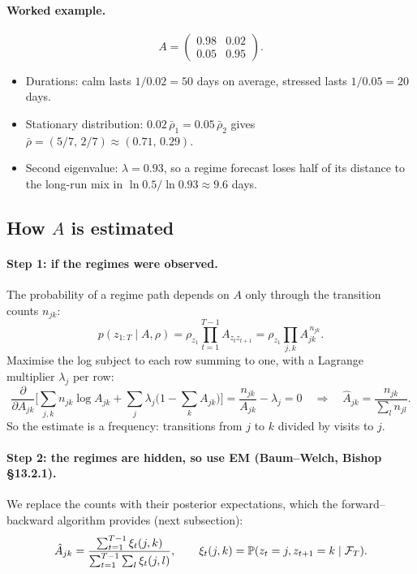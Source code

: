 \paragraph{Worked example.}
\begin{equation}
A=\begin{pmatrix}0.98&0.02\\0.05&0.95\end{pmatrix}.
\end{equation}
\begin{itemize}
  \item Durations: calm lasts $1/0.02=50$ days on average, stressed lasts $1/0.05=20$ days.
  \item Stationary distribution: $0.02\,\bar\rho_1=0.05\,\bar\rho_2$ gives $\bar\rho=(5/7,\,2/7)\approx(0.71,\,0.29)$.
  \item Second eigenvalue: $\lambda=0.93$, so a regime forecast loses half of its distance to the long-run mix in $\ln0.5/\ln0.93\approx9.6$ days.
\end{itemize}

\subsection{How $A$ is estimated}

\paragraph{Step 1: if the regimes were observed.} The probability of a regime path depends on $A$ only through the transition counts $n_{jk}$:
\begin{equation}
p(z_{1:T}\mid A,\rho)=\rho_{z_1}\prod_{t=1}^{T-1}A_{z_tz_{t+1}}=\rho_{z_1}\prod_{j,k}A_{jk}^{\,n_{jk}}.
\end{equation}
Maximise the log subject to each row summing to one, with a Lagrange multiplier $\lambda_j$ per row:
\begin{equation}
\frac{\partial}{\partial A_{jk}}\Big[\sum_{j,k}n_{jk}\log A_{jk}+\sum_j\lambda_j\Big(1-\sum_kA_{jk}\Big)\Big]=\frac{n_{jk}}{A_{jk}}-\lambda_j=0\quad\Rightarrow\quad\hat A_{jk}=\frac{n_{jk}}{\sum_ln_{jl}}.
\end{equation}
So the estimate is a frequency: transitions from $j$ to $k$ divided by visits to $j$.

\paragraph{Step 2: the regimes are hidden, so use EM (Baum--Welch, Bishop \S13.2.1).} We replace the counts with their posterior expectations, which the forward--backward algorithm provides (next subsection):
\begin{equation}
\hat A_{jk}=\frac{\sum_{t=1}^{T-1}\xi_t(j,k)}{\sum_{t=1}^{T-1}\sum_l\xi_t(j,l)},\qquad\xi_t(j,k)=\mathbb P(z_t=j,z_{t+1}=k\mid\mathcal{F}_T).
\end{equation}

